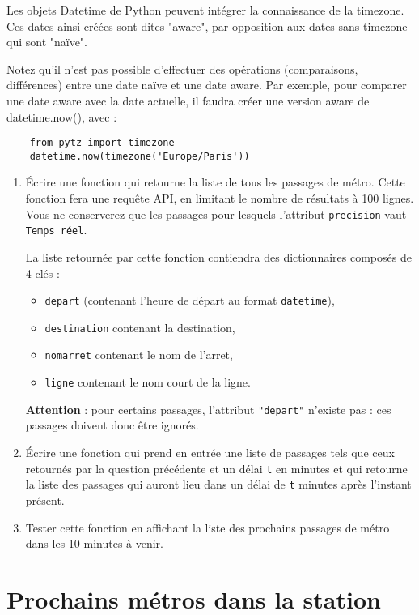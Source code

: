 \documentclass[11pt,a4paper]{article}
\begin{document}
Les objets Datetime de Python peuvent intégrer la connaissance de la timezone. Ces dates ainsi créées sont dites "aware", par opposition aux dates sans timezone qui sont "naïve". 

Notez qu'il n'est pas possible d'effectuer des opérations (comparaisons, différences) entre une date naïve et une date aware. Par exemple, pour comparer une date aware avec la date actuelle, il faudra créer une version aware de datetime.now(), avec : 
\begin{verbatim}
    from pytz import timezone
    datetime.now(timezone('Europe/Paris'))
\end{verbatim}

\begin{enumerate}
    \item Écrire une fonction qui retourne la liste de tous les passages de métro. Cette fonction fera une requête API, en limitant le nombre de résultats à 100 lignes.  Vous ne conserverez que les passages pour lesquels l'attribut \verb+precision+ vaut \verb+Temps réel+.
    
    La liste retournée par cette fonction contiendra des dictionnaires composés de 4 clés : 
    \begin{itemize}
        \item        \verb+depart+ (contenant l'heure de départ au format \verb+datetime+), 
        \item \verb+destination+ contenant la destination,
        \item \verb+nomarret+ contenant le nom de l'arret,
        \item \verb+ligne+ contenant le nom court de la ligne.
    \end{itemize}
        \textbf{Attention} : pour certains passages, l'attribut \verb+"depart"+ n'existe pas :
        ces passages doivent donc être ignorés.
    
    \item Écrire une fonction qui prend en entrée une liste de passages tels que ceux retournés par la question 
        précédente et un délai \verb+t+ en minutes et qui retourne la liste des passages qui auront lieu dans un délai de \verb+t+ minutes après l'instant présent. 
    \item Tester cette fonction en affichant la liste des prochains passages de métro dans 
        les 10 minutes à venir.
\end{enumerate}

\section{Prochains métros dans la station}
\end{document}
